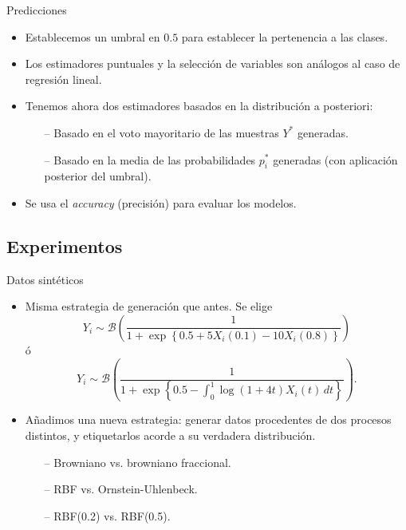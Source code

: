 \documentclass[10pt, spanish, professionalfonts]{beamer}
\begin{document}
\begin{frame}{Predicciones}

\begin{itemize}
  \item Establecemos un umbral en \(0.5\) para establecer la pertenencia a las clases.
   \item Los estimadores puntuales y la selección de variables son análogos al caso de regresión lineal.
   \item Tenemos ahora dos estimadores basados en la distribución a posteriori:
   \begin{itemize}
     \item[--] Basado en el voto mayoritario de las muestras \(Y^*\) generadas.
     \item[--] Basado en la media de las probabilidades \(p_i^*\) generadas (con aplicación posterior del umbral).
   \end{itemize}
  \item Se usa el \textit{accuracy} (precisión) para evaluar los modelos.
\end{itemize}
\end{frame}

\subsection{Experimentos}

\begin{frame}{Datos sintéticos}
  \begin{itemize}


  \item Misma estrategia de generación que antes. Se elige
  \[
    Y_i \sim \mathcal B\left(\frac{1}{1 + \exp\left\{0.5 + 5X_i(0.1) - 10X_i(0.8)\right\}}\right)
  \]
  ó
  \[
    Y_i \sim \mathcal B\left(\frac{1}{1 + \exp\left\{0.5 -\int_0^1 \log(1+4t)X_i(t)\, dt\right\}}\right).
  \]

  \vspace{1em}

  \item Añadimos una nueva estrategia: generar datos procedentes de dos procesos distintos, y etiquetarlos acorde a su verdadera distribución.
  \begin{itemize}
    \item[--] Browniano vs. browniano fraccional.
    \item[--] RBF vs. Ornstein-Uhlenbeck.
    \item[--] RBF(0.2) vs. RBF(0.5).
  \end{itemize}
\end{itemize}
\end{frame}
\end{document}
